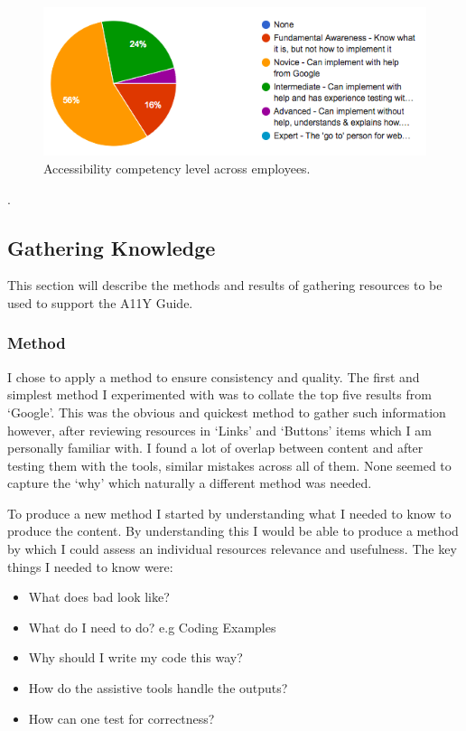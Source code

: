 \begin{figure}[H]
\centering
\centering
\includegraphics[width=\textwidth]{figures/questions/a11y_level}
\captionsetup{justification=centering}
\caption{Accessibility competency level across employees.
\label{fig:a11y_level}}
\end{figure}.

\subsection{Gathering Knowledge}
\label{sec:GatheringKnowledge}
This section will describe the methods and results of gathering resources to
be used to support the A11Y Guide.

\subsubsection{Method}
I chose to apply a method to ensure consistency and quality. The first and
simplest method I experimented with was to collate the top five results from
`Google'. This was the obvious and quickest method to gather such information
however, after reviewing resources in `Links' and `Buttons' items which I am
personally familiar with. I found a lot of overlap between content and after
testing them with the tools, similar mistakes across all of them.
None seemed to capture the `why' which naturally a
different method was needed.

To produce a new method I started by understanding what I needed to know to
produce the content. By understanding this I would be able to produce a method
by which I could assess an individual resources relevance and usefulness. The
key things I needed to know were:

\begin {itemize}
\item What does bad look like?
\item What do I need to do? e.g Coding Examples
\item Why should I write my code this way?
\item How do the assistive tools handle the outputs?
\item How can one test for correctness?
\end{itemize}

